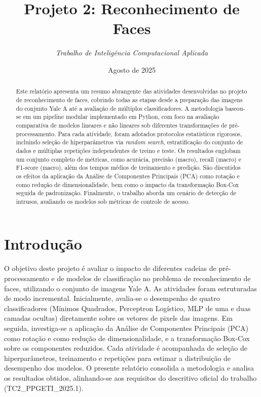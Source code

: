 \documentclass[11pt,a4paper]{article}
\title{Projeto 2: Reconhecimento de Faces}
\author{\textit{Trabalho de Inteligência Computacional Aplicada}}
\date{Agosto de 2025}
\begin{document}
\maketitle

\begin{abstract}
Este relatório apresenta um resumo abrangente das atividades desenvolvidas no projeto de reconhecimento de faces, cobrindo todas as etapas desde a preparação das imagens do conjunto Yale A até a avaliação de múltiplos classificadores. A metodologia baseou-se em um pipeline modular implementado em Python, com foco na avaliação comparativa de modelos lineares e não lineares sob diferentes transformações de pré-processamento. Para cada atividade, foram adotados protocolos estatísticos rigorosos, incluindo seleção de hiperparâmetros via \emph{random search}, estratificação do conjunto de dados e múltiplas repetições independentes de treino e teste. Os resultados englobam um conjunto completo de métricas, como acurácia, precisão (macro), recall (macro) e F1-score (macro), além dos tempos médios de treinamento e predição. São discutidos os efeitos da aplicação da Análise de Componentes Principais (PCA) como rotação e como redução de dimensionalidade, bem como o impacto da transformação Box-Cox seguida de padronização. Finalmente, o trabalho aborda um cenário de detecção de intrusos, avaliando os modelos sob métricas de controle de acesso.
\end{abstract}

\section{Introdução}

O objetivo deste projeto é avaliar o impacto de diferentes cadeias de pré-processamento e de modelos de classificação no problema de reconhecimento de faces, utilizando o conjunto de imagens Yale A. As atividades foram estruturadas de modo incremental. Inicialmente, avalia-se o desempenho de quatro classificadores (Mínimos Quadrados, Perceptron Logístico, MLP de uma e duas camadas ocultas) diretamente sobre os vetores de pixels das imagens. Em seguida, investiga-se a aplicação da Análise de Componentes Principais (PCA) como rotação e como redução de dimensionalidade, e a transformação Box-Cox sobre os componentes reduzidos. Cada atividade é acompanhada de seleção de hiperparâmetros, treinamento e repetições para estimar a distribuição de desempenho dos modelos. O presente relatório consolida a metodologia e analisa os resultados obtidos, alinhando-se aos requisitos do descritivo oficial do trabalho (TC2_PPGETI_2025.1).
\end{document}
